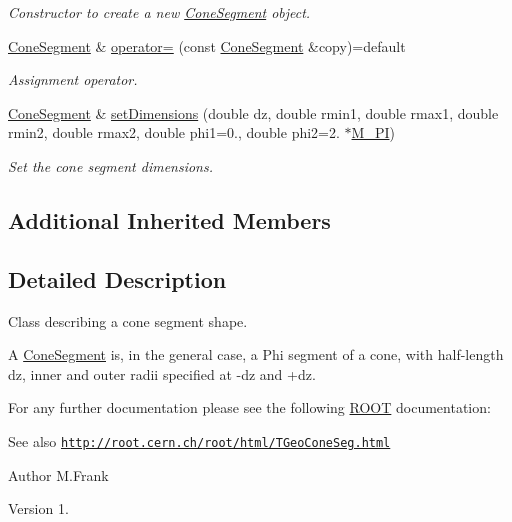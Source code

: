 \begin{DoxyCompactItemize}
\begin{DoxyCompactList}\small\item\em Constructor to create a new \hyperlink{class_d_d4hep_1_1_geometry_1_1_cone_segment}{Cone\+Segment} object. \end{DoxyCompactList}\item 
\hyperlink{class_d_d4hep_1_1_geometry_1_1_cone_segment}{Cone\+Segment} \& \hyperlink{class_d_d4hep_1_1_geometry_1_1_cone_segment_ae1f716f53de5892b6ab63e1b74c9375a}{operator=} (const \hyperlink{class_d_d4hep_1_1_geometry_1_1_cone_segment}{Cone\+Segment} \&copy)=default
\begin{DoxyCompactList}\small\item\em Assignment operator. \end{DoxyCompactList}\item 
\hyperlink{class_d_d4hep_1_1_geometry_1_1_cone_segment}{Cone\+Segment} \& \hyperlink{class_d_d4hep_1_1_geometry_1_1_cone_segment_a1c5563e5b474583f16caf12a4d3f7834}{set\+Dimensions} (double dz, double rmin1, double rmax1, double rmin2, double rmax2, double phi1=0., double phi2=2. $\ast$\hyperlink{_x_m_l_elements_8h_ae71449b1cc6e6250b91f539153a7a0d3}{M\+\_\+\+PI})
\begin{DoxyCompactList}\small\item\em Set the cone segment dimensions. \end{DoxyCompactList}\end{DoxyCompactItemize}
\subsection*{Additional Inherited Members}


\subsection{Detailed Description}
Class describing a cone segment shape. 

A \hyperlink{class_d_d4hep_1_1_geometry_1_1_cone_segment}{Cone\+Segment} is, in the general case, a Phi segment of a cone, with half-\/length dz, inner and outer radii specified at -\/dz and +dz.

For any further documentation please see the following \hyperlink{namespace_r_o_o_t}{R\+O\+OT} documentation\+: \begin{DoxySeeAlso}{See also}
\href{http://root.cern.ch/root/html/TGeoConeSeg.html}{\tt http\+://root.\+cern.\+ch/root/html/\+T\+Geo\+Cone\+Seg.\+html}
\end{DoxySeeAlso}
\begin{DoxyAuthor}{Author}
M.\+Frank 
\end{DoxyAuthor}
\begin{DoxyVersion}{Version}
1. 
\end{DoxyVersion}


